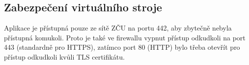 \subsection{Zabezpečení virtuálního stroje}
Aplikace je přístupná pouze ze sítě ZČU na portu 442, aby zbytečně nebyla přístupná komukoli. Proto je také ve firewallu vypnut přístup odkudkoli na port 443 (standardně pro HTTPS), zatímco port 80 (HTTP) bylo třeba otevřít pro přístup odkudkoli kvůli TLS certifikátu.
